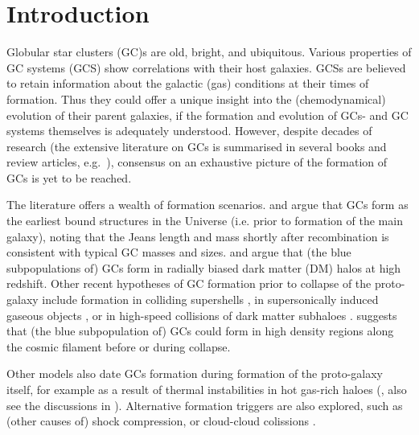 \documentclass[a4paper,fleqn,usenatbib]{mnras}
\begin{document}
\section{Introduction}
Globular star clusters (GC)s are old, bright, and ubiquitous. Various properties of
GC systems (GCS) show correlations with their host galaxies. GCSs are believed to
retain information about the galactic (gas) conditions at their times of formation.
Thus they could offer a unique insight into the (chemodynamical) evolution of their 
parent galaxies, if the formation and evolution of GCs- and GC systems themselves 
is adequately understood. However, despite decades of research (the extensive 
literature on GCs is summarised in several books and review articles, e.g.~\citealt{
1991ARA&A..29..543H, Harris2001, 2004Natur.427...31W, 2006ARA&A..44..193B, 
2012A&ARv..20...50G, 2014CQGra..31x4006K, 2018RSPSA.47470616F}), consensus on an 
exhaustive picture of the formation of GCs is yet to be reached.

The literature offers a wealth of formation scenarios. \citet{1968ApJ...154..891P}
and \citet{1984ApJ...277..470P} argue that GCs form as the earliest bound
structures in the Universe (i.e. prior to formation of the main galaxy), 
noting that the Jeans length and mass shortly after recombination is consistent
with typical GC masses and sizes. \citet{2005MNRAS.364..367D} and \citet{
2009ApJ...706L.192B} argue that (the blue subpopulations of) GCs form in radially
biased dark matter (DM) halos at high redshift. Other recent hypotheses of GC formation 
prior to collapse of the proto-galaxy include formation in colliding supershells 
\citep{2017Ap&SS.362..183R}, in supersonically induced gaseous objects
\citep{2019arXiv190408941C}, or in high-speed collisions of dark matter subhaloes
\citep{2019arXiv190508951M}. \citet{2017MNRAS.472.3120B} suggests
that (the blue subpopulation of) GCs could form in high density regions along
the cosmic filament before or during collapse.

Other models also date GCs formation during formation of the proto-galaxy itself,
for example as a result of thermal instabilities in hot gas-rich haloes 
(\citealt{1985ApJ...298...18F}, also see the discussions in \citealt{
1990ApJ...363..488K}). Alternative formation triggers are also explored, such as 
(other causes of) shock compression, or cloud-cloud colissions \citep[e.g.][]{
1980glcl.conf..301G, 1992ApJ...400..265M, 1994ApJ...429..177H, 1995ApJ...442..618V,
1996ASPC...92..241L, 2001ApJ...560..592C}. 
\end{document}

